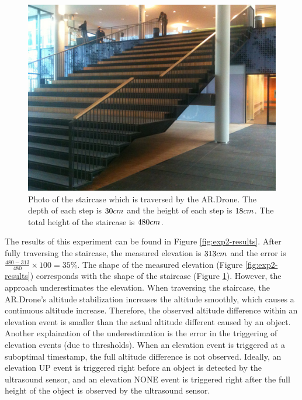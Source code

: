 \begin{figure}[htb!]
\centering
\includegraphics[width=0.4\linewidth]{images/exp2-stair-photo.jpg}
\caption{Photo of the staircase which is traversed by the AR.Drone. The depth of each step is $30\small{cm}$ and the height of each step is $18\small{cm}$. The total height of the staircase is $480\small{cm}$.}
\label{fig:exp2-stair-photo}
\end{figure}

The results of this experiment can be found in Figure \ref{fig:exp2-results}.
After fully traversing the staircase, the measured elevation is $313\begin{small}cm\end{small}$ and the error is $\frac{480 - 313}{480} \times 100 = 35\%$.
The shape of the measured elevation (Figure \ref{fig:exp2-results}) corresponds with the shape of the staircase (Figure \ref{fig:exp2-stair-photo}).
However, the approach underestimates the elevation.
When traversing the staircase, the AR.Drone's altitude stabilization increases the altitude smoothly, which causes a continuous altitude increase.
Therefore, the observed altitude difference within an elevation event is smaller than the actual altitude different caused by an object.
Another explaination of the underestimation is the error in the triggering of elevation events (due to thresholds).
When an elevation event is triggered at a suboptimal timestamp, the full altitude difference is not observed.
Ideally, an elevation UP event is triggered right before an object is detected by the ultrasound sensor, and an elevation NONE event is triggered right after the full height of the object is observed by the ultrasound sensor.


